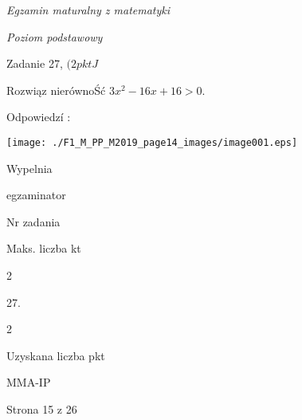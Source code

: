 \documentclass[a4paper,12pt]{article}
\begin{document}
{\it Egzamin maturalny z matematyki}

{\it Poziom podstawowy}

Zadanie 27, $(2pktJ$

Rozwiąz nierównoŚć $3x^{2}-16x+16>0.$

Odpowiedzí :
\begin{center}
\texttt{[image: ./F1\_M\_PP\_M2019\_page14\_images/image001.eps]}
\end{center}
Wypelnia

egzaminator

Nr zadania

Maks. liczba kt

2

27.

2

Uzyskana liczba pkt

MMA-IP

Strona 15 z 26
\end{document}
